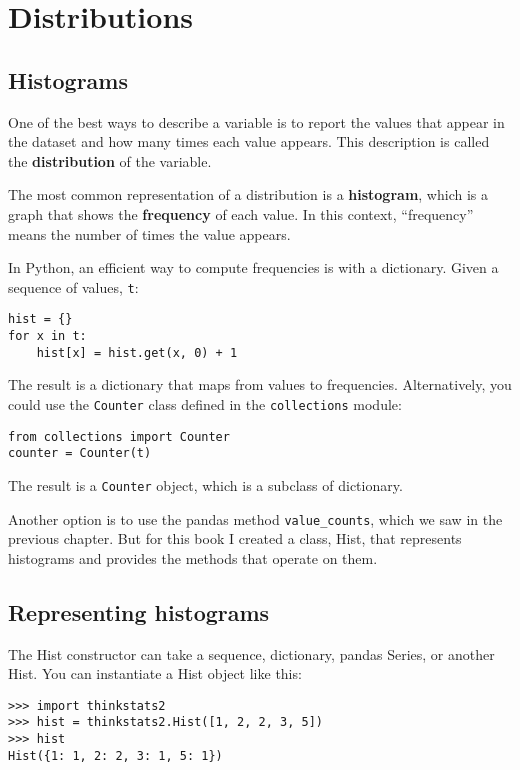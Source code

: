 \documentclass[12pt]{book}
\begin{document}
\chapter{Distributions}
\label{descriptive}


\section{Histograms}
\label{histograms}

One of the best ways to describe a variable is to report the values
that appear in the dataset and how many times each value appears.
This description is called the {\bf distribution} of the variable.

The most common representation of a distribution is a {\bf histogram},
which is a graph that shows the {\bf frequency} of each value.  In
this context, ``frequency'' means the number of times the value
appears.   

In Python, an efficient way to compute frequencies is with a
dictionary.  Given a sequence of values, {\tt t}:
%
\begin{verbatim}
hist = {}
for x in t:
    hist[x] = hist.get(x, 0) + 1
\end{verbatim}

The result is a dictionary that maps from values to frequencies.
Alternatively, you could use the {\tt Counter} class defined in the
{\tt collections} module:

\begin{verbatim}
from collections import Counter
counter = Counter(t)
\end{verbatim}

The result is a {\tt Counter} object, which is a subclass of
dictionary.

Another option is to use the pandas method \verb"value_counts", which
we saw in the previous chapter.  But for this book I created a class,
Hist, that represents histograms and provides the methods
that operate on them.


\section{Representing histograms}

The Hist constructor can take a sequence, dictionary, pandas
Series, or another Hist.  You can instantiate a Hist object like this:
%
\begin{verbatim}
>>> import thinkstats2
>>> hist = thinkstats2.Hist([1, 2, 2, 3, 5])
>>> hist
Hist({1: 1, 2: 2, 3: 1, 5: 1})
\end{verbatim}
\end{document}
